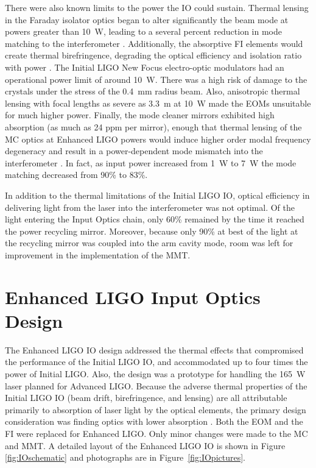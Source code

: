 There were also known limits to the power the IO could sustain.
Thermal lensing in the Faraday isolator optics began to alter
significantly the beam mode at powers greater than 10~W, leading to a
several percent reduction in mode matching to the interferometer
\citep{UFLIGOGroup2006Upgrading}.  Additionally, the absorptive FI
elements would create thermal birefringence, degrading the optical
efficiency and isolation ratio with power
\citep{Khazanov1999Investigation}.  The Initial LIGO New Focus
electro-optic modulators had an operational power limit of around
10~W. There was a high risk of damage to the crystals under the stress
of the 0.4~mm radius beam. Also, anisotropic thermal lensing with
focal lengths as severe as 3.3~m at 10~W made the EOMs unsuitable for
much higher power. Finally, the mode cleaner mirrors exhibited high
absorption (as much as 24 ppm per mirror), enough that thermal lensing
of the MC optics at Enhanced LIGO powers would induce higher order
modal frequency degeneracy and result in a power-dependent mode
mismatch into the interferometer \citep{Bullington2008Modal,
  Arain2007Note}. In fact, as input power increased from 1~W to 7~W
the mode matching decreased from 90\% to 83\%.

In addition to the thermal limitations of the Initial LIGO IO, optical
efficiency in delivering light from the laser into the interferometer
was not optimal. Of the light entering the Input Optics chain, only
60\% remained by the time it reached the power recycling
mirror. Moreover, because only 90\% at best of the light at the
recycling mirror was coupled into the arm cavity mode, room was left
for improvement in the implementation of the MMT.



\section{Enhanced LIGO Input Optics Design}
\label{sec:design}
The Enhanced LIGO IO design addressed the thermal effects that
compromised the performance of the Initial LIGO IO, and accommodated
up to four times the power of Initial LIGO. Also, the design was a
prototype for handling the 165~W laser planned for Advanced
LIGO. Because the adverse thermal properties of the Initial LIGO IO
(beam drift, birefringence, and lensing) are all attributable
primarily to absorption of laser light by the optical elements, the
primary design consideration was finding optics with lower absorption
\citep{UFLIGOGroup2006Upgrading}. Both the EOM and the FI were
replaced for Enhanced LIGO. Only minor changes were made to the MC and
MMT. A detailed layout of the Enhanced LIGO IO is shown in Figure
\ref{fig:IOschematic} and photographs are in
Figure~\ref{fig:IOpictures}.

